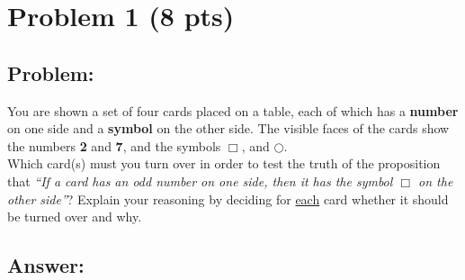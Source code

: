 \newpage

\section{Problem 1 (8 pts)}
\subsection{Problem:}

\noindent You are shown a set of four cards placed on a table, each of which has a \textbf{number} on one side and a \textbf{symbol} on the other side. The visible faces of the cards show the numbers \textbf{2} and \textbf{7}, and the symbols \textbf{$\Box$}, and \textbf{$\bigcirc$}.\\

\noindent Which card(s) must you turn over in order to test the truth of the proposition that \textit{``If a card has an odd number on one side, then it has the symbol $\Box$ on the other side''}? Explain your reasoning by deciding for \underline{each} card whether it should be turned over and why.\\

\subsection{Answer:}

